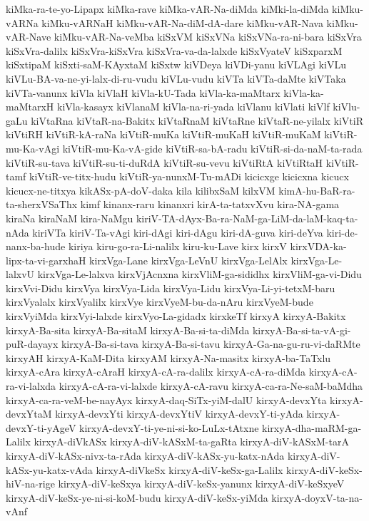 {kiMka-ra-te-yo-Lipapx
kiMka-rave
kiMka-vAR-Na-diMda
kiMki-la-diMda
kiMku-vARNa
kiMku-vARNaH
kiMku-vAR-Na-diM-dA-dare
kiMku-vAR-Nava
kiMku-vAR-Nave
kiMku-vAR-Na-veMba
kiSxVM
kiSxVNa
kiSxVNa-ra-ni-bara
kiSxVra
kiSxVra-dalilx
kiSxVra-kiSxVra
kiSxVra-va-da-lalxde
kiSxVyateV
kiSxparxM
kiSxtipaM
kiSxti-saM-KAyxtaM
kiSxtw
kiVDeya
kiVDi-yanu
kiVLAgi
kiVLu
kiVLu-BA-va-ne-yi-lalx-di-ru-vudu
kiVLu-vudu
kiVTa
kiVTa-daMte
kiVTaka
kiVTa-vanunx
kiVla
kiVlaH
kiVla-kU-Tada
kiVla-ka-maMtarx
kiVla-ka-maMtarxH
kiVla-kasayx
kiVlanaM
kiVla-na-ri-yada
kiVlanu
kiVlati
kiVlf
kiVlu-gaLu
kiVtaRna
kiVtaR-na-Bakitx
kiVtaRnaM
kiVtaRne
kiVtaR-ne-yilalx
kiVtiR
kiVtiRH
kiVtiR-kA-raNa
kiVtiR-muKa
kiVtiR-muKaH
kiVtiR-muKaM
kiVtiR-mu-Ka-vAgi
kiVtiR-mu-Ka-vA-gide
kiVtiR-sa-bA-radu
kiVtiR-si-da-naM-ta-rada
kiVtiR-su-tava
kiVtiR-su-ti-duRdA
kiVtiR-su-vevu
kiVtiRtA
kiVtiRtaH
kiVtiR-tamf
kiVtiR-ve-titx-hudu
kiVtiR-ya-nunxM-Tu-mADi
kicicxge
kicicxna
kicucx
kicucx-ne-titxya
kikASx-pA-doV-daka
kila
kilibxSaM
kilxVM
kimA-hu-BaR-ra-ta-sherxVSaThx
kimf
kinanx-raru
kinanxri
kirA-ta-tatxvXvu
kira-NA-gama
kiraNa
kiraNaM
kira-NaMgu
kiriV-TA-dAyx-Ba-ra-NaM-ga-LiM-da-laM-kaq-ta-nAda
kiriVTa
kiriV-Ta-vAgi
kiri-dAgi
kiri-dAgu
kiri-dA-guva
kiri-deYva
kiri-de-nanx-ba-hude
kiriya
kiru-go-ra-Li-nalilx
kiru-ku-Lave
kirx
kirxV
kirxVDA-ka-lipx-ta-vi-garxhaH
kirxVga-Lane
kirxVga-LeVnU
kirxVga-LelAlx
kirxVga-Le-lalxvU
kirxVga-Le-lalxva
kirxVjAcnxna
kirxVliM-ga-sididhx
kirxVliM-ga-vi-Didu
kirxVvi-Didu
kirxVya
kirxVya-Lida
kirxVya-Lidu
kirxVya-Li-yi-tetxM-baru
kirxVyalalx
kirxVyalilx
kirxVye
kirxVyeM-bu-da-nAru
kirxVyeM-bude
kirxVyiMda
kirxVyi-lalxde
kirxVyo-La-gidadx
kirxkeTf
kirxyA
kirxyA-Bakitx
kirxyA-Ba-sita
kirxyA-Ba-sitaM
kirxyA-Ba-si-ta-diMda
kirxyA-Ba-si-ta-vA-gi-puR-dayayx
kirxyA-Ba-si-tava
kirxyA-Ba-si-tavu
kirxyA-Ga-na-gu-ru-vi-daRMte
kirxyAH
kirxyA-KaM-Dita
kirxyAM
kirxyA-Na-masitx
kirxyA-ba-TaTxlu
kirxyA-cAra
kirxyA-cAraH
kirxyA-cA-ra-dalilx
kirxyA-cA-ra-diMda
kirxyA-cA-ra-vi-lalxda
kirxyA-cA-ra-vi-lalxde
kirxyA-cA-ravu
kirxyA-ca-ra-Ne-saM-baMdha
kirxyA-ca-ra-veM-be-nayAyx
kirxyA-daq-SiTx-yiM-dalU
kirxyA-devxYta
kirxyA-devxYtaM
kirxyA-devxYti
kirxyA-devxYtiV
kirxyA-devxY-ti-yAda
kirxyA-devxY-ti-yAgeV
kirxyA-devxY-ti-ye-ni-si-ko-LuLx-tAtxne
kirxyA-dha-maRM-ga-Lalilx
kirxyA-diVkASx
kirxyA-diV-kASxM-ta-gaRta
kirxyA-diV-kASxM-tarA
kirxyA-diV-kASx-nivx-ta-rAda
kirxyA-diV-kASx-yu-katx-nAda
kirxyA-diV-kASx-yu-katx-vAda
kirxyA-diVkeSx
kirxyA-diV-keSx-ga-Lalilx
kirxyA-diV-keSx-hiV-na-rige
kirxyA-diV-keSxya
kirxyA-diV-keSx-yanunx
kirxyA-diV-keSxyeV
kirxyA-diV-keSx-ye-ni-si-koM-budu
kirxyA-diV-keSx-yiMda
kirxyA-doyxV-ta-na-vAnf
}
